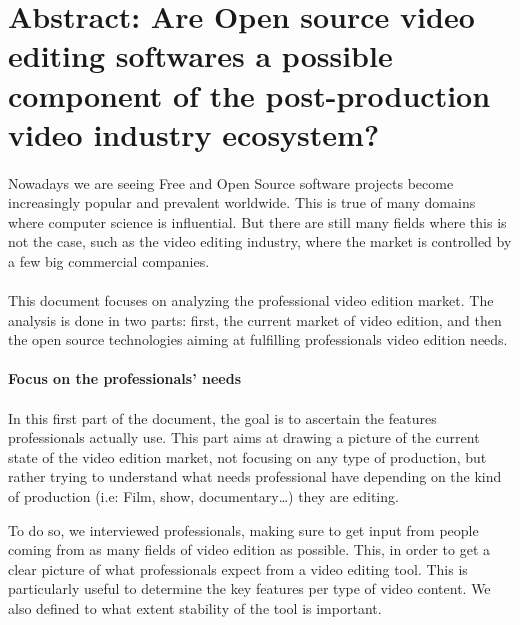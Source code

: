 \newpage\section*{Abstract: Are Open source video editing softwares
a possible
        component of the post-production video industry ecosystem?}

\paragraph{}

Nowadays we are seeing Free and Open Source software projects become
increasingly popular and prevalent worldwide. This is true of many
domains where computer science is influential. But there are still many
fields where this is not the case, such as the video editing industry,
where the market is controlled by a few big commercial companies.

\paragraph{}

This document focuses on analyzing the professional video edition
market. The analysis is done in two parts: first, the current market of
video edition, and then the open source technologies aiming at fulfilling
professionals video edition needs.


\paragraph{Focus on the professionals' needs}

\paragraph{}

In this first part of the document, the goal is to ascertain the features
professionals actually use. This part aims at drawing a picture of the
current state of the video edition market, not focusing on any type of
production, but rather trying to understand what needs professional have
depending on the kind of production (i.e: Film, show, documentary\ldots)
they are editing.

To do so, we interviewed professionals, making sure to get input from
people coming from as many fields of video edition as possible. This,
in order to get a clear picture of what professionals expect from a video
editing tool.  This is particularly useful to determine the key features
per type of video content.  We also defined to what extent stability of
the tool is important.

